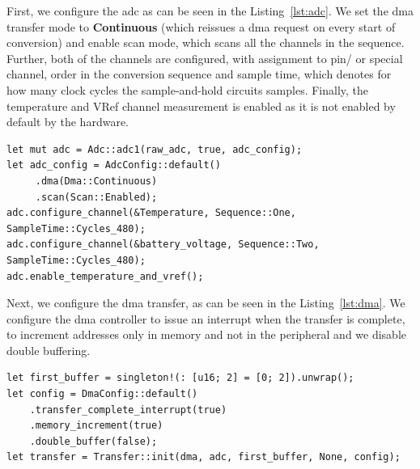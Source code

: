 First, we configure the \acs{adc} as can be seen in the Listing~\ref{lst:adc}.
We set the \acs{dma} transfer mode to \textbf{Continuous} (which reissues a \acs{dma} request on every start of conversion) and enable scan mode, which scans all the channels in the sequence.
Further, both of the channels are configured, with assignment to pin/ or special channel, order in the conversion sequence and sample time, which denotes for how many clock cycles the sample-and-hold circuits samples.
Finally, the temperature and VRef channel measurement is enabled as it is not enabled by default by the hardware.

\begin{lstlisting}[caption={Configuring ADC for temperature and voltage monitoring.},label=lst:adc]
let mut adc = Adc::adc1(raw_adc, true, adc_config);
let adc_config = AdcConfig::default()
     .dma(Dma::Continuous)
     .scan(Scan::Enabled);
adc.configure_channel(&Temperature, Sequence::One, SampleTime::Cycles_480);
adc.configure_channel(&battery_voltage, Sequence::Two, SampleTime::Cycles_480);
adc.enable_temperature_and_vref();
\end{lstlisting}

Next, we configure the \acs{dma} transfer, as can be seen in the Listing~\ref{lst:dma}.
We configure the \acs{dma} controller to issue an interrupt when the transfer is complete, to increment addresses only in memory and not in the peripheral and we disable double buffering.

\begin{lstlisting}[caption={Configuration of the DMA controller for ADC transfers.},label=lst:dma]
let first_buffer = singleton!(: [u16; 2] = [0; 2]).unwrap();
let config = DmaConfig::default()
    .transfer_complete_interrupt(true)
    .memory_increment(true)
    .double_buffer(false);
let transfer = Transfer::init(dma, adc, first_buffer, None, config);
\end{lstlisting}

